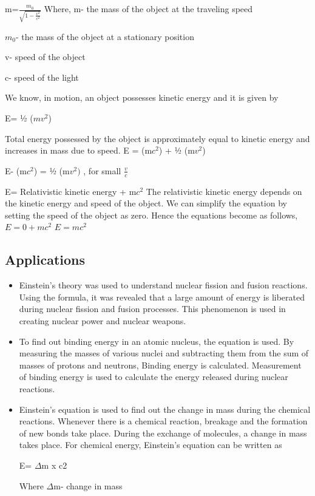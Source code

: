 \documentclass{article}
\begin{document}
m=$\frac{m_0}{\sqrt{1-\frac{v^2}{c^2}}}$
Where,
m- the mass of the object at the traveling speed

$m_0$- the mass of the object at a stationary position

v- speed of the object

c- speed of the light

We know, in motion, an object possesses kinetic energy and it is given by

E= ½ ($mv^2$)

Total energy possessed by the object is approximately equal to kinetic energy and increases in 
 mass due to speed. 
E = (m$c^2$) + ½ (m$v^2$)


E- (m$c^2$) = ½ (m$v^2)$   , for small $\frac{v}{c}$

E= Relativistic kinetic energy + m$c^2$
The relativistic kinetic energy depends on the kinetic energy and speed of the object. We can simplify the equation by setting the speed of the object as zero. Hence the equations become as follows,
$E= 0+mc^2$
$E= mc^2$
\subsection{Applications}

\begin{itemize}
    \item Einstein's theory was used to understand nuclear fission and fusion reactions. Using the formula, it was revealed that a large amount of energy is liberated during nuclear fission and fusion processes. This phenomenon is used in creating nuclear power and nuclear weapons.
\item  To find out binding energy in an atomic nucleus, the equation is used. By measuring the masses of various nuclei and subtracting them from the sum of masses of protons and neutrons, Binding energy is calculated. Measurement of binding energy is used to calculate the energy released during nuclear reactions. 
\item Einstein’s equation is used to find out the change in mass during the chemical reactions. Whenever there is a chemical reaction, breakage and the formation of new bonds take place. During the exchange of molecules, a change in mass takes place. For chemical energy, Einstein’s equation can be written as


E= $\Delta$m x c2

Where $\Delta$m- change in mass

\end{itemize}
\end{document}

